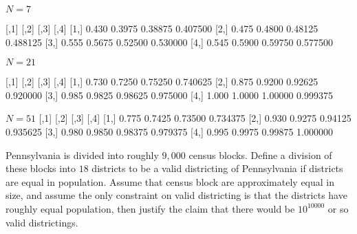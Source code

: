 \documentclass[12pt]{article}
\begin{document}
\begin{solution}
  \( N= 7 \)

        [,1]   [,2]    [,3]     [,4]
[1,] 0.430 0.3975 0.38875 0.407500
[2,] 0.475 0.4800 0.48125 0.488125
[3,] 0.555 0.5675 0.52500 0.530000
[4,] 0.545 0.5900 0.59750 0.577500

\( N = 21 \)

      [,1]   [,2]    [,3]     [,4]
[1,] 0.730 0.7250 0.75250 0.740625
[2,] 0.875 0.9200 0.92625 0.920000
[3,] 0.985 0.9825 0.98625 0.975000
[4,] 1.000 1.0000 1.00000 0.999375

\( N = 51 \)
      [,1]   [,2]    [,3]     [,4]
[1,] 0.775 0.7425 0.73500 0.734375
[2,] 0.930 0.9275 0.94125 0.935625
[3,] 0.980 0.9850 0.98375 0.979375
[4,] 0.995 0.9975 0.99875 1.000000

\end{solution}


\begin{exercise}
    Pennsylvania is divided into roughly \( 9,000 \) census blocks.
    Define a division of these blocks into \( 18 \) districts to be a
    valid districting of Pennsylvania if districts are equal in
    population. Assume that census block are approximately equal in
    size, and assume the only constraint on valid districting is that
    the districts have roughly equal population, then justify the claim
    that there would be \( 10^{10000} \) or so valid districtings.
\end{exercise}
\end{document}
